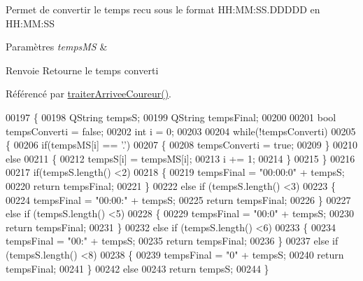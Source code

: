 Permet de convertir le temps recu sous le format H\+H\+:\+MM\+:S\+S.\+D\+D\+D\+DD en H\+H\+:\+MM\+:SS 
\begin{DoxyParams}{Paramètres}
{\em temps\+MS} & \\
\hline
\end{DoxyParams}
\begin{DoxyReturn}{Renvoie}
Retourne le temps converti 
\end{DoxyReturn}


Référencé par \hyperlink{class_course_a60073d16efd4ccefa81bddb4aaa88fab}{traiter\+Arrivee\+Coureur()}.


\begin{DoxyCode}
00197 \{
00198     QString tempsS;
00199     QString tempsFinal;
00200 
00201     \textcolor{keywordtype}{bool} tempsConverti = \textcolor{keyword}{false};
00202     \textcolor{keywordtype}{int} i = 0;
00203 
00204     \textcolor{keywordflow}{while}(!tempsConverti)
00205     \{
00206         \textcolor{keywordflow}{if}(tempsMS[i] == \textcolor{charliteral}{'.'})
00207         \{
00208             tempsConverti = \textcolor{keyword}{true};
00209         \}
00210         \textcolor{keywordflow}{else}
00211         \{
00212             tempsS[i] = tempsMS[i];
00213             i += 1;
00214         \}
00215     \}
00216 
00217     \textcolor{keywordflow}{if}(tempsS.length() <2)
00218     \{
00219         tempsFinal = \textcolor{stringliteral}{"00:00:0"} + tempsS;
00220         \textcolor{keywordflow}{return} tempsFinal;
00221     \}
00222     \textcolor{keywordflow}{else} \textcolor{keywordflow}{if} (tempsS.length() <3)
00223     \{
00224         tempsFinal = \textcolor{stringliteral}{"00:00:"} + tempsS;
00225         \textcolor{keywordflow}{return} tempsFinal;
00226     \}
00227     \textcolor{keywordflow}{else} \textcolor{keywordflow}{if} (tempsS.length() <5)
00228     \{
00229         tempsFinal = \textcolor{stringliteral}{"00:0"} + tempsS;
00230         \textcolor{keywordflow}{return} tempsFinal;
00231     \}
00232     \textcolor{keywordflow}{else} \textcolor{keywordflow}{if} (tempsS.length() <6)
00233     \{
00234         tempsFinal = \textcolor{stringliteral}{"00:"} + tempsS;
00235         \textcolor{keywordflow}{return} tempsFinal;
00236     \}
00237     \textcolor{keywordflow}{else} \textcolor{keywordflow}{if} (tempsS.length() <8)
00238     \{
00239         tempsFinal = \textcolor{stringliteral}{"0"} + tempsS;
00240         \textcolor{keywordflow}{return} tempsFinal;
00241     \}
00242     \textcolor{keywordflow}{else}
00243         \textcolor{keywordflow}{return} tempsS;
00244 \}
\end{DoxyCode}
\mbox{\label{class_course_a2056f5c20f56e2c7eeea8195a55857bc}} 
